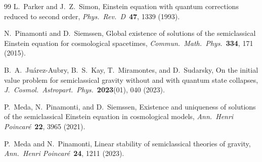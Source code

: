 \documentclass[12pt,a4paper]{article}
\begin{document}
\begin{thebibliography}{99}
 L.~Parker and J.~Z.~Simon, Einstein equation with quantum
corrections reduced to second order, \textit{Phys.\ Rev.\ D}\ \textbf{47}, 1339 (1993).

 N.~Pinamonti and D.~Siemssen, Global existence of solutions
of the semiclassical Einstein equation for cosmological spacetimes,
\textit{Commun.\ Math.\ Phys.}\ \textbf{334}, 171 (2015).

 B.~A.~Ju\'arez-Aubry, B.~S.~Kay, T.~Miramontes, and D.~Sudarsky,
On the initial value problem for semiclassical gravity without and with quantum state
collapses, \textit{J.\ Cosmol.\ Astropart.\ Phys.}\ \textbf{2023}(01), 040 (2023).

 P.~Meda, N.~Pinamonti, and D.~Siemssen,
Existence and uniqueness of solutions of the semiclassical Einstein equation in
cosmological models, \textit{Ann.\ Henri Poincar\'e}\ \textbf{22}, 3965 (2021).

 P.~Meda and N.~Pinamonti,
Linear stability of semiclassical theories of gravity,
\textit{Ann.\ Henri Poincar\'e}\ \textbf{24}, 1211 (2023).

\end{thebibliography}
\end{document}
